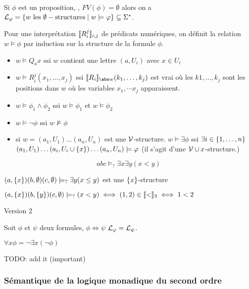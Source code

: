 Si $\phi$ est un proposition, \cad, $FV(\phi) = \emptyset$ alors on a $\mathcal{L}_{\varphi} = \left\{w \text { les } \emptyset-\text{structures} \mid w \models \varphi\right\} \subseteq \Sigma^{*}$.


Pour une interprétation $\llbracket R_i^j \rrbracket_{{i,j}}$ de prédicats numériques, on définit la relation $w \models \phi$ par induction sur la structure de la formule $\phi$.

\begin{itemize}
	\item $w \models Q_a x$ ssi $w$ contient une lettre $(a,U_i)$ avec $x \in U_i$
	\item $w \models R_i^j(x_1, \ldots, x_j)$ ssi $\interpret {R_i}_{\abs w}(k_1, \ldots, k_j)$ est vrai où les $k1, \ldots, k_j$ sont les positions dans $w$ où les variables
	      $x_1, \cdots x_j$ apparaissent.
	\item $w \models \phi_1 \land \phi_2$ ssi $w \models \phi_1$ et $w \models \phi_2$
	\item $w \models \lnot \phi$ ssi $w \nvDash \phi$
	\item si $w = (a_1, U_1) \ldots (a_n, U_n)$ est une $\mathcal{V}$-structure.
	      $w \models \exists \phi$ ssi $\exists i \in \left\{1, \ldots, n\right\}$
	      $(a_1, U_1) \ldots  (a_i, U_i \cup \left\{x\right\})  \ldots (a_n, U_n) \models \varphi$
	      (il s'agit d'une $\mathcal{V} \cup {x}$-structure.)
\end{itemize}

\begin{exemple}
	$$abc \models_? \exists x \exists y (x < y)$$

	$(a, \left\{x\right\})(b, \emptyset)(c, \emptyset) \models_? \exists y (x \leq y)$ est une $\left\{x\right\} $-structure

	$(a, \left\{x\right\})(b, \left\{y\right\})(c, \emptyset) \models_? (x < y) \iff (1,2) \in \llbracket < \rrbracket_3 \iff 1 < 2$

	Version 2

\end{exemple}


Soit $\phi$ et $\psi$ deux formules, $\phi \iff \psi$ \ssi $\mathcal{L}_{\varphi} = \mathcal{L}_{\psi}$.

\begin{abbreviation}
	$\forall x \phi = \neg \exists x (\neg \phi)$
\end{abbreviation}

\begin{exemple}
	TODO: add it (important)
\end{exemple}


\subsubsection{Sémantique de la logique monadique du second ordre}


